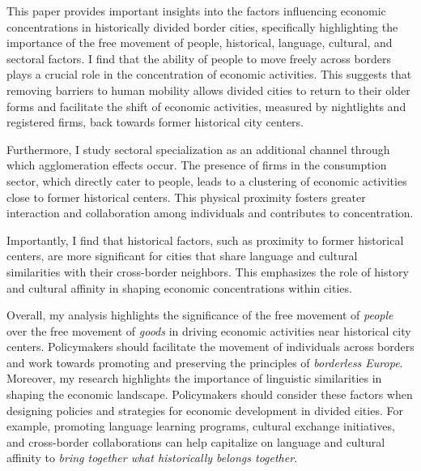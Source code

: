 \documentclass[12pt]{article}    %
\begin{document}
\par This paper provides important insights into the factors influencing economic concentrations in historically divided border cities, specifically highlighting the importance of the free movement of people, historical, language, cultural, and sectoral factors. I find that the ability of people to move freely across borders plays a crucial role in the concentration of economic activities. This suggests that removing barriers to human mobility allows divided cities to return to their older forms and facilitate the shift of economic activities, measured by nightlights and registered firms, back towards former historical city centers.


\par Furthermore, I study sectoral specialization as an additional channel through which agglomeration effects occur. The presence of firms in the consumption sector, which directly cater to people, leads to a clustering of economic activities close to former historical centers. This physical proximity fosters greater interaction and collaboration among individuals and contributes to concentration.

\par Importantly, I find that historical factors, such as proximity to former historical centers, are more significant for cities that share language and cultural similarities with their cross-border neighbors. This emphasizes the role of history and cultural affinity in shaping economic concentrations within cities.

\par Overall, my analysis highlights the significance of the free movement of \textit{people} over the free movement of \textit{goods} in driving economic activities near historical city centers. Policymakers should facilitate the movement of individuals across borders and work towards promoting and preserving the principles of \textit{borderless Europe}. Moreover, my research highlights the importance of linguistic similarities in shaping the economic landscape. Policymakers should consider these factors when designing policies and strategies for economic development in divided cities. For example, promoting language learning programs, cultural exchange initiatives, and cross-border collaborations can help capitalize on language and cultural affinity to \textit{bring together what historically belongs together}.



\newpage
\end{document}
